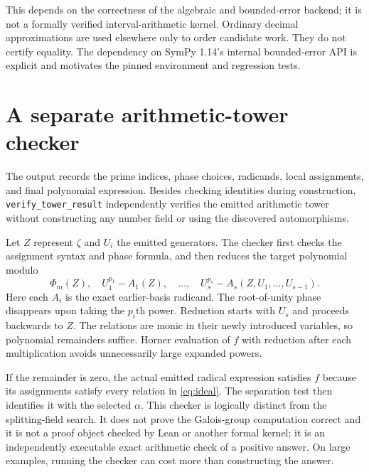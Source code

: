 \documentclass[11pt,a4paper]{article}
\theoremstyle{definition}\newtheorem{definition}[theorem]{Definition}
\theoremstyle{remark}\newtheorem{remark}[theorem]{Remark}
\newcommand{\code}[1]{\texttt{#1}}
\begin{document}
This depends on the correctness of the algebraic and bounded-error backend;
it is not a formally verified interval-arithmetic kernel. Ordinary decimal
approximations are used elsewhere only to order candidate work. They do not
certify equality. The dependency on SymPy 1.14's internal bounded-error API
is explicit and motivates the pinned environment and regression tests.

\section{A separate arithmetic-tower checker}
The output records the prime indices, phase choices, radicands, local
assignments, and final polynomial expression. Besides checking identities
during construction, \code{verify\_tower\_result} independently verifies the
emitted arithmetic tower without constructing any number field or using the
discovered automorphisms.

Let $Z$ represent $\zeta$ and $U_i$ the emitted generators. The checker first
checks the assignment syntax and phase formula, and then reduces the target
polynomial modulo
\begin{equation}\label{eq:ideal}
 \Phi_m(Z),\quad
 U_1^{p_1}-A_1(Z),\quad\ldots,\quad
 U_s^{p_s}-A_s(Z,U_1,\ldots,U_{s-1}).
\end{equation}
Here each $A_i$ is the exact earlier-basis radicand. The root-of-unity phase
disappears upon taking the $p_i$th power. Reduction starts with $U_s$ and
proceeds backwards to $Z$. The relations are monic in their newly introduced
variables, so polynomial remainders suffice. Horner evaluation of $f$ with
reduction after each multiplication avoids unnecessarily large expanded
powers.

If the remainder is zero, the actual emitted radical expression satisfies
$f$ because its assignments satisfy every relation in \eqref{eq:ideal}.
The separation test then identifies it with the selected $\alpha$. This
checker is logically distinct from the splitting-field search. It does not
prove the Galois-group computation correct and it is not a proof object
checked by Lean or another formal kernel; it is an independently executable
exact arithmetic check of a positive answer. On large examples, running the
checker can cost more than constructing the answer.
\end{document}
